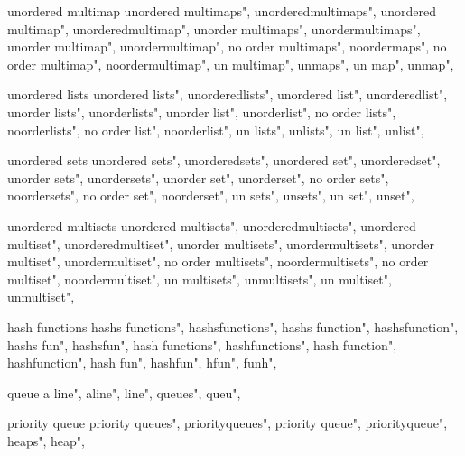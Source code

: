          unordered multimap 
        unordered multimaps", 
        unorderedmultimaps", 
        unordered multimap", 
        unorderedmultimap", 
        unorder multimaps", 
        unordermultimaps", 
        unorder multimap", 
        unordermultimap", 
        no order multimaps", 
        noordermaps", 
        no order multimap", 
        noordermultimap", 
        un multimap", 
        unmaps", 
        un map", 
        unmap", 
        
         unordered lists 
        unordered lists", 
        unorderedlists", 
        unordered list", 
        unorderedlist", 
        unorder lists", 
        unorderlists", 
        unorder list", 
        unorderlist", 
        no order lists", 
        noorderlists", 
        no order list", 
        noorderlist", 
        un lists", 
        unlists", 
        un list", 
        unlist", 
        
         unordered sets
        unordered sets", 
        unorderedsets", 
        unordered set", 
        unorderedset", 
        unorder sets", 
        unordersets", 
        unorder set", 
        unorderset", 
        no order sets", 
        noordersets", 
        no order set", 
        noorderset", 
        un sets", 
        unsets", 
        un set", 
        unset", 
        
         unordered multisets
        unordered multisets", 
        unorderedmultisets", 
        unordered multiset", 
        unorderedmultiset", 
        unorder multisets", 
        unordermultisets", 
        unorder multiset", 
        unordermultiset", 
        no order multisets", 
        noordermultisets", 
        no order multiset", 
        noordermultiset", 
        un multisets", 
        unmultisets", 
        un multiset", 
        unmultiset", 
        
         hash functions
        hashs functions",  
        hashsfunctions",  
        hashs function",  
        hashsfunction",  
        hashs fun",  
        hashsfun",  
        hash functions",  
        hashfunctions",  
        hash function",  
        hashfunction",  
        hash fun",  
        hashfun",  
        hfun",  
        funh",  
        
         queue 
        a line",
        aline",
        line",
        queues",
        queu",
        
         priority queue 
        priority queues",  
        priorityqueues",  
        priority queue",  
        priorityqueue",  
        heaps",  
        heap",  
        
